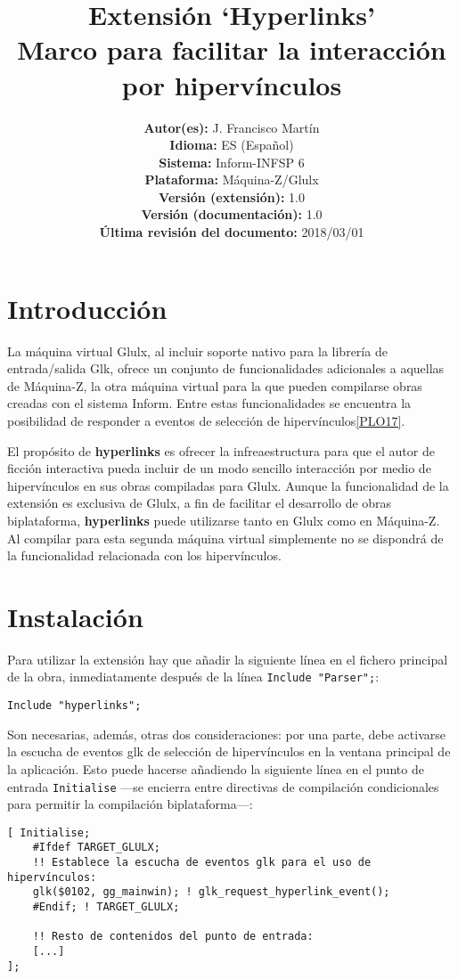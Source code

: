 \documentclass[a4paper,12pt]{article}
\title{\vspace{-3cm}Extensión `Hyperlinks'\\
    \Large{Marco para facilitar la interacción por hipervínculos}}
\author{
	\small{\textbf{Autor(es):} J. Francisco Martín}\\
	\small{\textbf{Idioma:} ES (Español)}\\
	\small{\textbf{Sistema:} Inform-INFSP 6}\\
	\small{\textbf{Plataforma:} Máquina-Z/Glulx}\\
	\small{\textbf{Versión (extensión):} 1.0}\\
	\small{\textbf{Versión (documentación):} 1.0}\\
	\small{\textbf{Última revisión del documento:} 2018/03/01}
}
\date{}
\numberwithin{equation}{section}
\begin{document}
\maketitle


\section{Introducción} \label{sec:introduccion}

La máquina virtual Glulx, al incluir soporte nativo para la librería de entrada/salida Glk, ofrece un conjunto de funcionalidades adicionales a aquellas de Máquina-Z, la otra máquina virtual para la que pueden compilarse obras creadas con el sistema Inform. Entre estas funcionalidades se encuentra la posibilidad de responder a eventos de selección de hipervínculos\ref{PLO17}.

El propósito de \textbf{hyperlinks} es ofrecer la infreaestructura para que el autor de ficción interactiva pueda incluir de un modo sencillo interacción por medio de hipervínculos en sus obras compiladas para Glulx. Aunque la funcionalidad de la extensión es exclusiva de Glulx, a fin de facilitar el desarrollo de obras biplataforma, \textbf{hyperlinks} puede utilizarse tanto en Glulx como en Máquina-Z. Al compilar para esta segunda máquina virtual simplemente no se dispondrá de la funcionalidad relacionada con los hipervínculos.


\section{Instalación} \label{sec:instalacion}

Para utilizar la extensión hay que añadir la siguiente línea en el fichero principal de la obra, inmediatamente después de la línea \verb|Include "Parser";|:

\begin{verbatim}
Include "hyperlinks";
\end{verbatim}

Son necesarias, además, otras dos consideraciones: por una parte, debe activarse la escucha de eventos glk de selección de hipervínculos en la ventana principal de la aplicación. Esto puede hacerse añadiendo la siguiente línea en el punto de entrada \verb|Initialise| ---se encierra entre directivas de compilación condicionales para permitir la compilación biplataforma---:

\begin{verbatim}
[ Initialise;
	#Ifdef TARGET_GLULX;
	!! Establece la escucha de eventos glk para el uso de hipervínculos:
	glk($0102, gg_mainwin); ! glk_request_hyperlink_event();
	#Endif; ! TARGET_GLULX;

	!! Resto de contenidos del punto de entrada:
	[...]
];
\end{verbatim}
\end{document}

